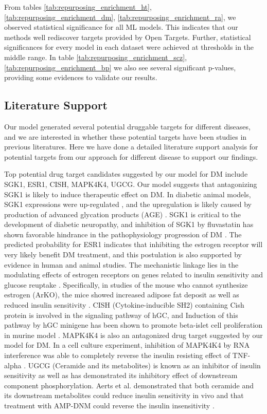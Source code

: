     From tables \ref{tab:repurposing_enrichment_ht}, \ref{tab:repurposing_enrichment_dm}, \ref{tab:repurposing_enrichment_ra}, we observed statistical significance for all ML models. This indicates that our methods well rediscover targets provided by Open Targets. Further, statistical significances for every model in each dataset were achieved at thresholds in the middle range. In table \ref{tab:repurposing_enrichment_scz}, \ref{tab:repurposing_enrichment_bp} we also see several significant p-values, providing some evidences to validate our results.

  \subsection{Literature Support}
    Our model generated several potential druggable targets for different diseases, and we are interested in whether these potential targets have been studies in previous literatures. Here we have done a detailed literature support analysis for potential targets from our approach for different disease to support our findings. 

    Top potential drug target candidates suggested by our model for DM include SGK1, ESR1, CISH, MAPK4K4, UGCG. Our model suggests that antagonizing SGK1 is likely to induce therapeutic effect on DM. In diabetic animal models, SGK1 expressions were up-regulated \cite{hills2006high, xuebin2005expression,chang2007enhancement}, and the upregulation is likely caused by production of advanced glycation products (AGE) \cite{hills2006high,chang2007enhancement}. SGK1 is critical to the development of diabetic neuropathy, and inhibition of SGK1 by fluvastatin has shown favorable hindrance in the pathophysiology progression of DM \cite{xuebin2005expression}. The predicted probability for ESR1 indicates that inhibiting the estrogen receptor will very likely benefit DM treatment, and this postulation is also supported by evidence in human \cite{barros2006estrogen} and animal \cite{weigt2015effects} studies. The mechanistic linkage lies in the modulating effects of estrogen receptors on genes related to insulin sensitivity and glucose reuptake \cite{barros2006estrogen}. Specifically, in studies of the mouse who cannot synthesize estrogen (ArKO), the mice showed increased adipose fat deposit as well as reduced insulin sensitivity \cite{jones2000aromatase,takeda2003progressive}. CISH (Cytokine-inducible SH2) containing Cish protein is involved in the signaling pathway of hGC, and Induction of this pathway by hGC minigene has been shown to promote beta-islet cell proliferation in murine model \cite{baan2015transgenic}. MAPK4K4 is also an antagonized drug target suggested by our model for DM. In a cell culture experiment, inhibition of MAPK4K4 by RNA interference was able to completely reverse the insulin resisting effect of TNF-alpha \cite{bouzakri2007map4k4}. UGCG (Ceramide and its metabolites) is known as an inhibitor of insulin sensitivity as well as has demonstrated its inhibitory effect of downstream component phosphorylation. Aerts et al. demonstrated that both ceramide and its downstream metabolites could reduce insulin sensitivity in vivo and that treatment with AMP-DNM could reverse the insulin insensitivity \cite{aerts2007pharmacological}. 
  
